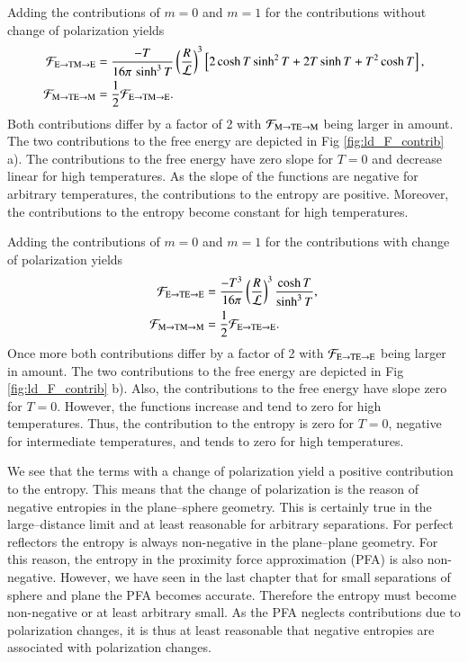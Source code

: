 Adding the contributions of $m=0$ and $m=1$ for the contributions without change of polarization yields
\begin{align}
\label{eq:ld_F_ETME}
\mathcal{F}_{\text{E}\to\mathrm{TM}\to\text{E}} &= \frac{-T}{16\pi \, \sinh^3 T} \left(\frac{R}{\mathcal{L}}\right)^3 \left[ 2\cosh T \sinh^2 T + 2 T \sinh T + T^2 \cosh T \right], \\
\label{eq:ld_F_MTEM}
\mathcal{F}_{\text{M}\to\mathrm{TE}\to\text{M}} &= \frac{1}{2} \mathcal{F}_{\text{E}\to\mathrm{TM}\to\text{E}}.
\end{align}
Both contributions differ by a factor of 2 with $\mathcal{F}_{\text{M}\to\mathrm{TE}\to\text{M}}$
being larger in amount. The two contributions to the free energy are depicted in
Fig \ref{fig:ld_F_contrib} a). The contributions to the free energy have zero
slope for $T=0$ and decrease linear for high temperatures. As the slope of the
functions are negative for arbitrary temperatures, the contributions to the
entropy are positive. Moreover, the contributions to the entropy become
constant for high temperatures.

Adding the contributions of $m=0$ and $m=1$ for the contributions with change of polarization yields
\begin{align}
\label{eq:ld_F_ETEE}
\mathcal{F}_{\text{E}\to\mathrm{TE}\to\text{E}} &= \frac{-T^3}{16\pi} \left(\frac{R}{\mathcal{L}}\right)^3 \frac{\cosh T}{\sinh^3 T}, \\
\label{eq:ld_F_MTMM}
\mathcal{F}_{\text{M}\to\mathrm{TM}\to\text{M}} &= \frac{1}{2} \mathcal{F}_{\text{E}\to\mathrm{TE}\to\text{E}}.
\end{align}
Once more both contributions differ by a factor of 2 with
$\mathcal{F}_{\text{E}\to\mathrm{TE}\to\text{E}}$ being larger in amount. The two contributions
to the free energy are depicted in Fig \ref{fig:ld_F_contrib} b). Also, the
contributions to the free energy have slope zero for $T=0$. However, the
functions increase and tend to zero for high temperatures. Thus, the
contribution to the entropy is zero for $T=0$, negative for intermediate
temperatures, and tends to zero for high temperatures.

We see that the terms with a change of polarization yield a positive
contribution to the entropy. This means that the change of polarization is the
reason of negative entropies in the plane--sphere geometry. This is certainly
true in the large--distance limit and at least reasonable for arbitrary
separations. For perfect reflectors the entropy is always non-negative in the
plane--plane geometry. For this reason, the entropy in the proximity force
approximation (PFA) is also non-negative. However, we have seen in the last
chapter that for small separations of sphere and plane the PFA becomes
accurate. Therefore the entropy must become non-negative or at least arbitrary
small. As the PFA neglects contributions due to polarization changes, it is
thus at least reasonable that negative entropies are associated with
polarization changes.

